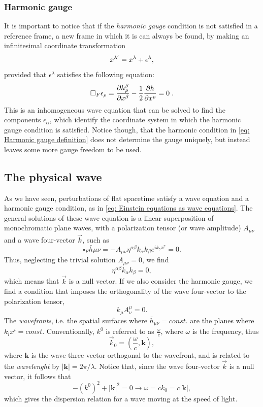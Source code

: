 \subsubsection{Harmonic gauge}
It is important to notice that if the \textit{harmonic gauge} condition is not satisfied in a reference frame, a new frame in which it is can always be found, by making an infinitesimal coordinate transformation
\begin{equation}
    x^{\lambda'} = x^\lambda + \epsilon^\lambda,
    \notag
\end{equation}
provided that $\epsilon^\lambda$ satisfies the following equation:
\[
    \square_F\epsilon_\rho = \frac{\partial h^\beta_\rho}{\partial x^\beta} - \frac{1}{2} \frac{\partial h}{\partial x^\rho} = 0\hspace{1mm}.
\]
This is an inhomogeneous wave equation that can be solved to find the components $\epsilon_\alpha$, which identify the coordinate system in which the harmonic gauge condition is satisfied.
Notice though, that the harmonic condition in \eqref{eq: Harmonic gauge definition} does not determine the gauge uniquely, but instead leaves some more gauge freedom to be used.

\subsection{The physical wave}
As we have seen, perturbations of flat spacetime satisfy a wave equation and a harmonic gauge condition, as in \eqref{eq: Einstein equations as wave equations}.
The general solutions of these wave equation is a linear superposition of monochromatic plane waves, with a polarization tensor (or wave amplitude) $A_{\mu\nu}$ and a wave four-vector $\vec{k}$, such as
\[
    \square_F \bar{h}{\mu\nu} = -A_{\mu\nu}\eta^{\alpha\beta} k_\alpha k_\beta e^{ik_\gamma x^\gamma} = 0.
\]
Thus, neglecting the trivial solution $A_{\mu\nu} = 0$, we find
\[
    \eta^{\alpha\beta} k_\alpha k_\beta = 0,
\]
which means that $\vec{k}$ is a null vector.
If we also consider the harmonic gauge, we find a condition that imposes the orthogonality  of the wave four-vector to the polarization tensor,
\[
    k_\mu A^\mu_\nu = 0.
\]
The \textit{wavefronts}, i.e. the spatial surfaces where $\bar{h}_{\mu\nu}= const.$ are the planes where $k_ix^i=const.$
Conventionally, $k^0$ is referred to as $\frac{\omega}{c}$, where $\omega$ is the frequency, thus
\[
    \vec{k}_0 = \left(\frac{\omega}{c},\mathbf{k}\right),
\]
where $\mathbf{k}$ is the wave three-vector orthogonal to the wavefront, and is related to the \textit{wavelenght} by $|\mathbf{k}| = 2\pi/\lambda$.
Notice that, since the wave four-vector $\vec{k}$ is a null vector, it follows that
\[
    -(k^0)^2 + |\mathbf{k}|^2 = 0 \to \omega = ck_0 = c|\mathbf{k}|,
\]
which gives the dispersion relation for a wave moving at the speed of light.



